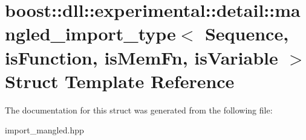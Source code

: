 \hypertarget{a01688}{}\section{boost\+:\+:dll\+:\+:experimental\+:\+:detail\+:\+:mangled\+\_\+import\+\_\+type$<$ Sequence, is\+Function, is\+Mem\+Fn, is\+Variable $>$ Struct Template Reference}
\label{a01688}


The documentation for this struct was generated from the following file\+:\begin{DoxyCompactItemize}
\item 
import\+\_\+mangled.\+hpp\end{DoxyCompactItemize}
